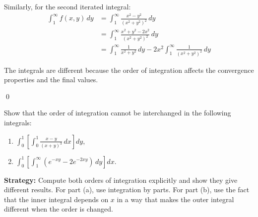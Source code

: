 \begin{enumerate}[label=(\alph*)]
Similarly, for the second iterated integral:
\begin{align*}
\int_{1}^{\infty} f(x, y) \, dy &= \int_{1}^{\infty} \frac{x^2 - y^2}{(x^2 + y^2)^2} \, dy \\
&= \int_{1}^{\infty} \frac{x^2 + y^2 - 2x^2}{(x^2 + y^2)^2} \, dy \\
&= \int_{1}^{\infty} \frac{1}{x^2 + y^2} \, dy - 2x^2 \int_{1}^{\infty} \frac{1}{(x^2 + y^2)^2} \, dy
\end{align*}

The integrals are different because the order of integration affects the convergence properties and the final values.
\end{enumerate}\qed


\begin{problembox}
\begin{problemstatement}
Show that the order of integration cannot be interchanged in the following integrals:
\begin{enumerate}[label=(\alph*)]
\item $\int_{0}^{1} \left[ \int_{0}^{1} \frac{x - y}{(x + y)^{3}} \, dx \right] dy$,
\item $\int_{0}^{1} \left[ \int_{1}^{\infty} (e^{-xy} - 2e^{-2xy}) \, dy \right] dx.$
\end{enumerate}
\end{problemstatement}
\end{problembox}

\noindent\textbf{Strategy:} Compute both orders of integration explicitly and show they give different results. For part (a), use integration by parts. For part (b), use the fact that the inner integral depends on $x$ in a way that makes the outer integral different when the order is changed.

